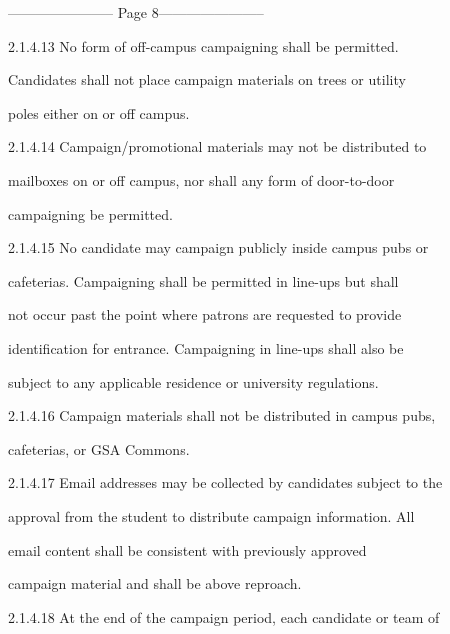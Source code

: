 ----------------------- Page 8-----------------------

  

2.1.4.13       No     form      of    off-campus         campaigning          shall     be    permitted.  



               Candidates shall not place campaign materials on trees or utility  



               poles either on or off campus.   

  

2.1.4.14       Campaign/promotional               materials       may     not     be    distributed      to  



               mailboxes on or off campus, nor shall any form of door-to-door  



               campaigning be permitted.   

  

2.1.4.15       No  candidate  may  campaign  publicly  inside  campus  pubs  or  

               cafeterias.  Campaigning  shall  be  permitted  in  line-ups  but  shall  

               not  occur  past  the  point  where  patrons  are  requested  to  provide  

               identification for entrance. Campaigning in line-ups shall also be  

               subject to any applicable residence or university regulations.   

  

2.1.4.16       Campaign  materials  shall  not  be  distributed  in  campus  pubs,  

               cafeterias, or GSA Commons.   

  

2.1.4.17       Email  addresses  may  be  collected  by  candidates  subject  to  the  

               approval from the student to distribute campaign information. All  

               email   content   shall   be   consistent   with   previously   approved  

               campaign material and shall be above reproach.   

  

2.1.4.18       At  the  end  of  the  campaign  period,  each  candidate  or  team  of  

